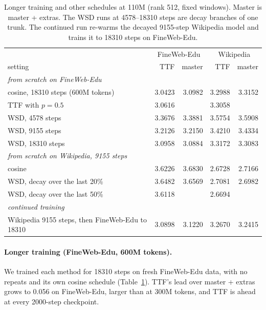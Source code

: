 \documentclass[10pt,twocolumn]{article}
\begin{document}
\begin{table}[t]
\centering
\caption{Longer training and other schedules at 110M (rank 512, fixed windows). Master is master + extras. The WSD runs
at 4578--18310 steps are decay branches of one trunk. The continued run re-warms the decayed 9155-step Wikipedia model
and trains it to 18310 steps on FineWeb-Edu.}
\label{tab:sched}
\begin{tabular}{lrrrr}
\toprule
 & \multicolumn{2}{c}{FineWeb-Edu} & \multicolumn{2}{c}{Wikipedia} \\
setting & TTF & master & TTF & master \\
\midrule
\multicolumn{5}{l}{\emph{from scratch on FineWeb-Edu}} \\
cosine, 18310 steps (600M tokens) & 3.0423 & 3.0982 & 3.2988 & 3.3152 \\
\quad TTF with $p=0.5$ & 3.0616 & & 3.3058 & \\
WSD, 4578 steps & 3.3676 & 3.3881 & 3.5754 & 3.5908 \\
WSD, 9155 steps & 3.2126 & 3.2150 & 3.4210 & 3.4334 \\
WSD, 18310 steps & 3.0958 & 3.0884 & 3.3172 & 3.3083 \\
\multicolumn{5}{l}{\emph{from scratch on Wikipedia, 9155 steps}} \\
cosine & 3.6226 & 3.6830 & 2.6728 & 2.7166 \\
WSD, decay over the last 20\% & 3.6482 & 3.6569 & 2.7081 & 2.6982 \\
WSD, decay over the last 50\% & 3.6118 & & 2.6694 & \\
\multicolumn{5}{l}{\emph{continued training}} \\
Wikipedia 9155 steps, then FineWeb-Edu to 18310 & 3.0898 & 3.1220 & 3.2670 & 3.2415 \\
\bottomrule
\end{tabular}
\end{table}

\paragraph{Longer training (FineWeb-Edu, 600M tokens).} We trained each method for 18310 steps on fresh FineWeb-Edu data,
with no repeats and its own cosine schedule (Table~\ref{tab:sched}). TTF's lead over master + extras grows to 0.056 on
FineWeb-Edu, larger than at 300M tokens, and TTF is ahead at every 2000-step checkpoint.
\end{document}
